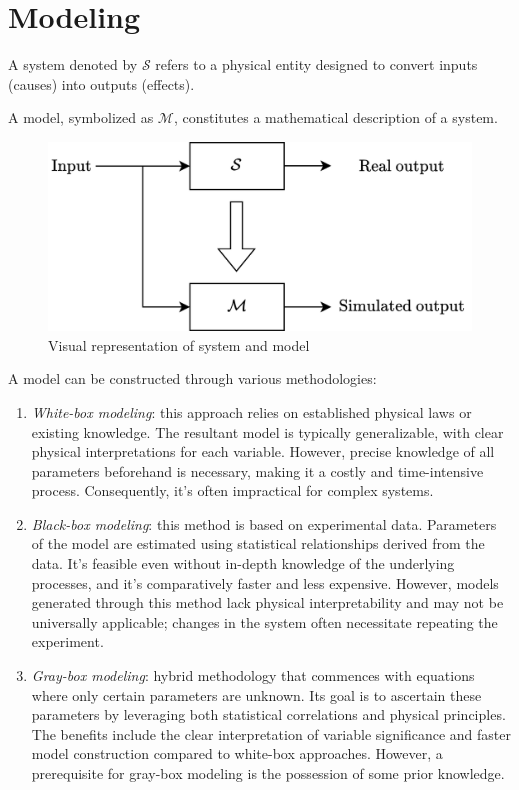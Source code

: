 \section{Modeling}

\begin{definition}
    A system denoted by $\mathcal{S}$ refers to a physical entity designed to convert inputs (causes) into outputs (effects).
\end{definition}
\begin{definition}
    A model, symbolized as $\mathcal{M}$, constitutes a mathematical description of a system.
\end{definition}

\begin{figure}[H]
    \centering
    \includegraphics[width=0.5\linewidth]{images/model.png}
    \caption{Visual representation of system and model}
\end{figure}

A model can be constructed through various methodologies:
\begin{enumerate}
    \item \textit{White-box modeling}: this approach relies on established physical laws or existing knowledge. 
        The resultant model is typically generalizable, with clear physical interpretations for each variable.
        However, precise knowledge of all parameters beforehand is necessary, making it a costly and time-intensive process. 
        Consequently, it's often impractical for complex systems.
    \item \textit{Black-box modeling}: this method is based on experimental data. 
        Parameters of the model are estimated using statistical relationships derived from the data. 
        It's feasible even without in-depth knowledge of the underlying processes, and it's comparatively faster and less expensive. 
        However, models generated through this method lack physical interpretability and may not be universally applicable; changes in the system often necessitate repeating the experiment.
    \item \textit{Gray-box modeling}: hybrid methodology that commences with equations where only certain parameters are unknown. 
        Its goal is to ascertain these parameters by leveraging both statistical correlations and physical principles. 
        The benefits include the clear interpretation of variable significance and faster model construction compared to white-box approaches. 
        However, a prerequisite for gray-box modeling is the possession of some prior knowledge.
\end{enumerate}